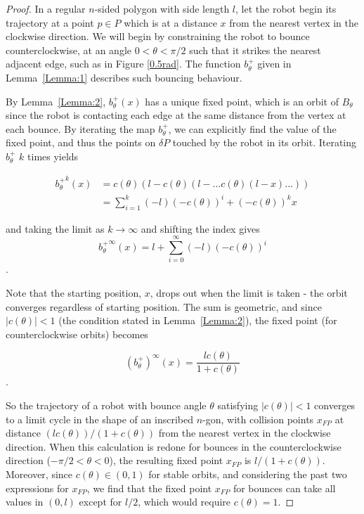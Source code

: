 \documentclass[letterpaper, 10 pt, conference]{ieeeconf}  %
\begin{document}
\begin{proof}
In a regular $n$-sided polygon with side length $l$, let the robot begin its
trajectory at a point $p \in P$ which is at a distance $x$ from the nearest
vertex in the clockwise direction. We will begin by constraining the robot to
bounce counterclockwise, at an angle $0 < \theta < \pi/2$ 
such that it strikes the nearest
adjacent edge, such as in Figure \ref{0.5rad}. The function $b^+_{\theta}$ 
given in Lemma~\ref{Lemma:1} describes such bouncing behaviour.

By Lemma~\ref{Lemma:2}, $b^+_{\theta}(x)$ has a unique fixed point, which is
an orbit of $B_\theta$ since the
robot is contacting each edge at the same distance from the
vertex at each bounce. By iterating the map $b^+_{\theta}$,
we can explicitly find the value of
the fixed point, and thus the points on $\delta P$ touched by the
robot in its orbit. Iterating $b^+_{\theta}$ $k$ times yields

\begin{align*}
{b^+_{\theta}}^k(x) & = c(\theta) (l-c(\theta)(l- \ldots c(\theta)(l-x) \ldots )) \\
                & = \sum_{i=1}^{k} (-l) (-c(\theta))^i + (-c(\theta))^kx 
\end{align*}

\noindent and taking the limit as $k \to \infty$ and shifting the index gives
\begin{equation*}
{b^+_{\theta}}^\infty(x) = l + \sum\limits_{i=0}^\infty (-l)(-c(\theta))^i
\end{equation*}
.

Note that the starting position, $x$, drops out when the limit
is taken - the orbit converges regardless of
starting position. The sum is geometric, and since $|c(\theta)| < 1$ 
(the condition stated in Lemma~\ref{Lemma:2}), the fixed point 
(for counterclockwise orbits) becomes

\begin{equation*}
(b^+_{\theta})^\infty(x) = \frac{lc(\theta)}{1+c(\theta)}
\end{equation*}
.

So the trajectory of a robot with bounce angle $\theta$ satisfying
$|c(\theta)| < 1$ converges to a limit cycle in the shape of an inscribed
$n$-gon, with collision points $x_{FP}$ at distance $(lc(\theta))/(1+c(\theta))$
from the nearest vertex in the clockwise direction. When this calculation is
redone for bounces in the counterclockwise direction ($-\pi/2 < \theta < 0$), the resulting fixed point
$x_{FP}$ is $l/(1 + c(\theta))$. Moreover, since $c(\theta) \in (0, 1)$ 
for stable orbits, and considering the past two
expressions for $x_{FP}$, we find that the fixed point $x_{FP}$ for bounces can
take all values in $(0, l)$ except for $l/2$, which would require
$c(\theta) = 1$.


\end{proof}
\end{document}
